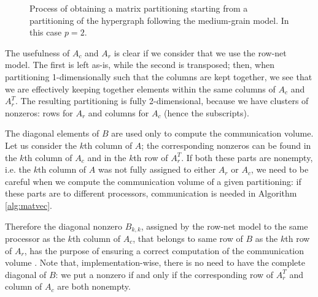 \begin{figure}[h]

	\caption{Process of obtaining a matrix partitioning starting from a partitioning of the hypergraph following the medium-grain model. In this case $p=2$.}
	\label{fig:mediumgrain-2}
\end{figure}

The usefulness of $A_c$ and $A_r$ is clear if we consider that we use the row-net model. The first is left as-is, while the second is transposed; then, when partitioning 1-dimensionally such that the columns are kept together, we see that we are effectively keeping together elements within the same columns of $A_c$ and $A_r^T$. The resulting partitioning is fully 2-dimensional, because we have clusters of nonzeros: rows for $A_r$ and columns for $A_c$ (hence the subscripts).

The diagonal elements of $B$ are used only to compute the communication volume. Let us consider the $k$th column of $A$; the corresponding nonzeros can be found in the $k$th column of $A_c$  and in the $k$th row of $A_r^T$. If both these parts are nonempty, i.e. the $k$th column of $A$ was not fully assigned to either $A_r$ or $A_c$, we need to be careful when we compute the communication volume of a given partitioning: if these parts are to different processors, communication is needed in Algorithm \ref{alg:matvec}.

Therefore the diagonal nonzero $B_{k,k}$, assigned by the row-net model to the same processor as the $k$th column of $A_c$, that belongs to same row of $B$ as the $k$th row of $A_r$, has the purpose of ensuring a correct computation of the communication volume \cite[Th.~3.1]{mediumgrain}. Note that, implementation-wise, there is no need to have the complete diagonal of $B$: we put a nonzero if and only if the corresponding row of $A_r^T$ and column of $A_c$ are both nonempty.

